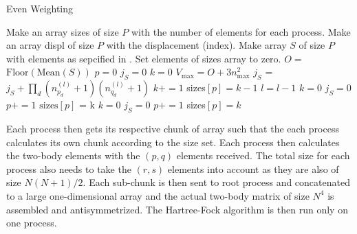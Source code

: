         \begin{algorithm}[H]
            \caption{Even Weighting}\label{alg:parasumweight}
            \begin{algorithmic}[H]
                \State Make an array sizes of size $P$ with the number of
                elements for each process.
                \State Make an array displ of size $P$ with the displacement
                (index).
                \State Make array $S$ of size $P$ with elements as sepcified in
                .
                \State Set elements of sizes array to zero.
                \State $O = $ $\text{Floor}(\text{Mean}(S))$
                \State $p = 0$ 
                \State $j_S = 0$ 
                \State $k = 0$ 
                \State $V_{\text{max}} = O + 3n^2_{\text{max}}$
                 
                    \State $j_S$ = $j_S + \prod\limits_d (n^{(l)}_{p_d}+1)
                    (n^{(l)}_{q_d}+1)$
                    \State $k += 1$
                     
                        \State sizes$[p] = k-1$ 
                        \State $l = l - 1$ 
                        \State $k=0$
                        \State $j_S=0$
                        \State $p += 1$
                     
                        \State $\text{sizes}[p]$ = k 
                        \State $k=0$
                        \State $j_S=0$
                        \State $p += 1$
                        \State sizes$[p] = k$
                    \EndIf
                \EndFor
            \end{algorithmic}
        \end{algorithm}
    Each process then gets its respective chunk of  array such
    that the each process calculates its own chunk according to the size set.
    Each process then calculates the two-body elements with the $(p,q)$
    elements received. The total size for each process also needs to take the
    $(r,s)$ elements into account as they are also of size $N(N+1)/2$. Each
    sub-chunk is then sent to root process and concatenated to a large
    one-dimensional array and the actual two-body matrix of size $N^4$ is
    assembled and antisymmetrized. The Hartree-Fock algorithm is then run only
    on one process.

